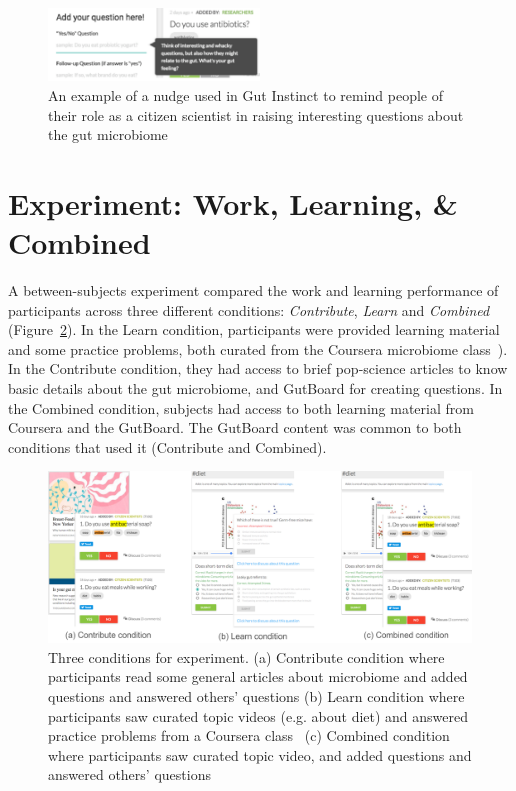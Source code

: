 \begin{figure}
  \centering
  \includegraphics[width=0.5\textwidth]{figures/gutinstinct/gi-5.png}
  \caption[An example of a nudge used in Gut Instinct]
{An example of a nudge used in Gut Instinct to remind people of their role as a citizen scientist in raising interesting questions about the gut microbiome }
  \label{fig:gi-5}
\end{figure} 

\section{Experiment: Work, Learning, \& Combined}
A between-subjects experiment compared the work and learning performance of participants across three different conditions: \textit{Contribute}, \textit{Learn} and \textit{Combined} (Figure~\ref{fig:gi_6}). In the Learn condition, participants were provided learning material and some practice problems, both curated from the Coursera microbiome class~\cite{Knight2016}). In the Contribute condition, they had access to brief pop-science articles to know basic details about the gut microbiome, and GutBoard for creating questions. In the Combined condition, subjects had access to both learning material from Coursera and the GutBoard. The GutBoard content was common to both conditions that used it (Contribute and Combined).

\begin{figure}[h]
  \centering
  \includegraphics[width=1.0\textwidth]{figures/gutinstinct/gi-6.png}
  \caption[Three conditions for experiment]
{Three conditions for experiment. (a) Contribute condition where participants read some general articles about microbiome and added questions and answered others’ questions (b) Learn condition where participants saw curated topic videos (e.g. about diet) and answered practice problems from a Coursera class~\cite{Knight2016} (c) Combined condition where participants saw curated topic video, and added questions and answered others’ questions }
  \label{fig:gi_6}
\end{figure}

